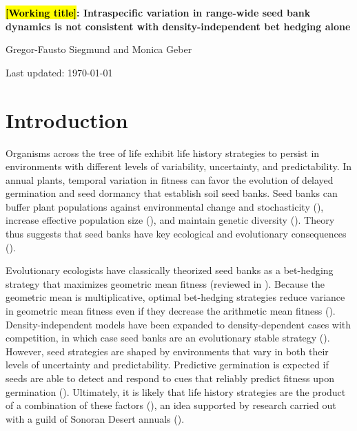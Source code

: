 \documentclass[12pt, oneside, titlepage]{article}   	%
\begin{document}
\begin{titlepage}
   \begin{center}
       \vspace*{1cm}
 
       \textbf{\hl{[Working title]}: Intraspecific variation in range-wide seed bank dynamics is not consistent with density-independent bet hedging alone}
 
       \vspace{1.5cm}
 
       Gregor-Fausto Siegmund and Monica Geber
 
   	Last updated: \today
	

	
 
   \end{center}
\end{titlepage}
%

\section{Introduction}

Organisms across the tree of life exhibit life history strategies to persist in environments with different levels of variability, uncertainty, and predictability. In annual plants, temporal variation in fitness can favor the evolution of delayed germination and seed dormancy that establish soil seed banks. Seed banks can buffer plant populations against environmental change and stochasticity (\cite{eager2014,paniw2017}), increase effective population size (\cite{nunney2002,waples2006}), and maintain genetic diversity (\cite{mccue1998b}). Theory thus suggests that seed banks have key ecological and evolutionary consequences (\cite{evans2005}). 

Evolutionary ecologists have classically theorized seed banks as a bet-hedging strategy that maximizes geometric mean fitness (reviewed in \cite{philippi1989,simons2011}). Because the geometric mean is multiplicative, optimal bet-hedging strategies reduce variance in geometric mean fitness even if they decrease the arithmetic mean fitness (\cite{cohen1966}). Density-independent models have been expanded to density-dependent cases with competition, in which case seed banks are an evolutionary stable strategy (\cite{ellner1985,ellner1985a}). However, seed strategies are shaped by environments that vary in both their levels of uncertainty and predictability. Predictive germination is expected if seeds are able to detect and respond to cues that reliably predict fitness upon germination (\cite{cohen1967}). Ultimately, it is likely that life history strategies are the product of a combination of these factors (\cite{simons2011}), an idea supported by research carried out with a guild of Sonoran Desert annuals (\cite{venable2007,gremer2014,gremer2016}).
\end{document}
